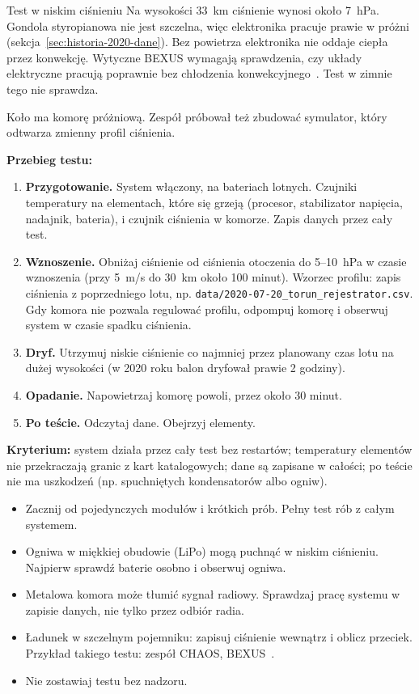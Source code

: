 \begin{podsekcja}{Test w niskim ciśnieniu}\label{sec:test-proznia}
Na wysokości \SI{33}{km} ciśnienie wynosi około \SI{7}{hPa}. Gondola styropianowa nie jest szczelna, więc elektronika pracuje prawie w próżni (sekcja~\ref{sec:historia-2020-dane}). Bez powietrza elektronika nie oddaje ciepła przez konwekcję. Wytyczne BEXUS wymagają sprawdzenia, czy układy elektryczne pracują poprawnie bez chłodzenia konwekcyjnego~\cite{bexustech}. Test w zimnie tego nie sprawdza.

Koło ma komorę próżniową. Zespół próbował też zbudować symulator, który odtwarza zmienny profil ciśnienia.

\textbf{Przebieg testu:}
\begin{enumerate}
  \item \textbf{Przygotowanie.} System włączony, na bateriach lotnych. Czujniki temperatury na elementach, które się grzeją (procesor, stabilizator napięcia, nadajnik, bateria), i czujnik ciśnienia w komorze. Zapis danych przez cały test.
  \item \textbf{Wznoszenie.} Obniżaj ciśnienie od ciśnienia otoczenia do 5--\SI{10}{hPa} w czasie wznoszenia (przy \SI{5}{m/s} do \SI{30}{km} około 100 minut). Wzorzec profilu: zapis ciśnienia z poprzedniego lotu, np. \texttt{data/2020-07-20\_torun\_rejestrator.csv}. Gdy komora nie pozwala regulować profilu, odpompuj komorę i obserwuj system w czasie spadku ciśnienia.
  \item \textbf{Dryf.} Utrzymuj niskie ciśnienie co najmniej przez planowany czas lotu na dużej wysokości (w 2020 roku balon dryfował prawie 2 godziny).
  \item \textbf{Opadanie.} Napowietrzaj komorę powoli, przez około 30 minut.
  \item \textbf{Po teście.} Odczytaj dane. Obejrzyj elementy.
\end{enumerate}

\textbf{Kryterium:} system działa przez cały test bez restartów; temperatury elementów nie przekraczają granic z kart katalogowych; dane są zapisane w całości; po teście nie ma uszkodzeń (np. spuchniętych kondensatorów albo ogniw).

\begin{uwaga}
\begin{itemize}
  \item Zacznij od pojedynczych modułów i krótkich prób. Pełny test rób z całym systemem.
  \item Ogniwa w miękkiej obudowie (LiPo) mogą puchnąć w niskim ciśnieniu. Najpierw sprawdź baterie osobno i obserwuj ogniwa.
  \item Metalowa komora może tłumić sygnał radiowy. Sprawdzaj pracę systemu w zapisie danych, nie tylko przez odbiór radia.
  \item Ładunek w szczelnym pojemniku: zapisuj ciśnienie wewnątrz i oblicz przeciek. Przykład takiego testu: zespół CHAOS, BEXUS~\cite{chaosvac}.
  \item Nie zostawiaj testu bez nadzoru.
\end{itemize}
\end{uwaga}
\end{podsekcja}

